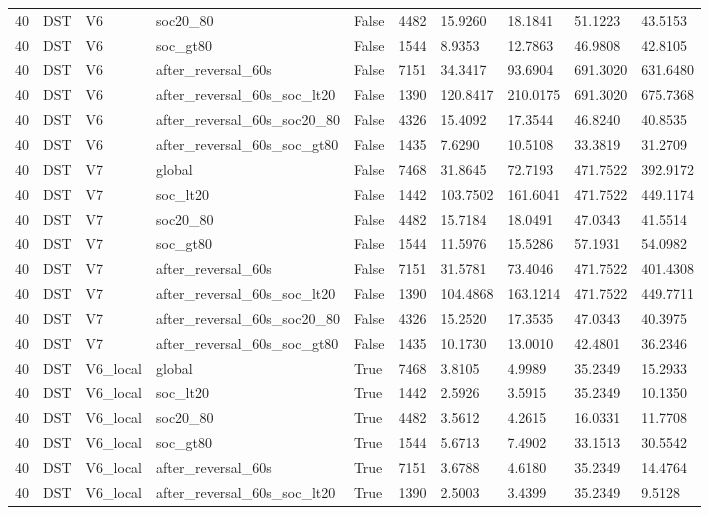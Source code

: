 \begin{tabular}{llllllllll}
40 & DST & V6 & soc20\_80 & False & 4482 & 15.9260 & 18.1841 & 51.1223 & 43.5153 \\
40 & DST & V6 & soc\_gt80 & False & 1544 & 8.9353 & 12.7863 & 46.9808 & 42.8105 \\
40 & DST & V6 & after\_reversal\_60s & False & 7151 & 34.3417 & 93.6904 & 691.3020 & 631.6480 \\
40 & DST & V6 & after\_reversal\_60s\_soc\_lt20 & False & 1390 & 120.8417 & 210.0175 & 691.3020 & 675.7368 \\
40 & DST & V6 & after\_reversal\_60s\_soc20\_80 & False & 4326 & 15.4092 & 17.3544 & 46.8240 & 40.8535 \\
40 & DST & V6 & after\_reversal\_60s\_soc\_gt80 & False & 1435 & 7.6290 & 10.5108 & 33.3819 & 31.2709 \\
40 & DST & V7 & global & False & 7468 & 31.8645 & 72.7193 & 471.7522 & 392.9172 \\
40 & DST & V7 & soc\_lt20 & False & 1442 & 103.7502 & 161.6041 & 471.7522 & 449.1174 \\
40 & DST & V7 & soc20\_80 & False & 4482 & 15.7184 & 18.0491 & 47.0343 & 41.5514 \\
40 & DST & V7 & soc\_gt80 & False & 1544 & 11.5976 & 15.5286 & 57.1931 & 54.0982 \\
40 & DST & V7 & after\_reversal\_60s & False & 7151 & 31.5781 & 73.4046 & 471.7522 & 401.4308 \\
40 & DST & V7 & after\_reversal\_60s\_soc\_lt20 & False & 1390 & 104.4868 & 163.1214 & 471.7522 & 449.7711 \\
40 & DST & V7 & after\_reversal\_60s\_soc20\_80 & False & 4326 & 15.2520 & 17.3535 & 47.0343 & 40.3975 \\
40 & DST & V7 & after\_reversal\_60s\_soc\_gt80 & False & 1435 & 10.1730 & 13.0010 & 42.4801 & 36.2346 \\
40 & DST & V6\_local & global & True & 7468 & 3.8105 & 4.9989 & 35.2349 & 15.2933 \\
40 & DST & V6\_local & soc\_lt20 & True & 1442 & 2.5926 & 3.5915 & 35.2349 & 10.1350 \\
40 & DST & V6\_local & soc20\_80 & True & 4482 & 3.5612 & 4.2615 & 16.0331 & 11.7708 \\
40 & DST & V6\_local & soc\_gt80 & True & 1544 & 5.6713 & 7.4902 & 33.1513 & 30.5542 \\
40 & DST & V6\_local & after\_reversal\_60s & True & 7151 & 3.6788 & 4.6180 & 35.2349 & 14.4764 \\
40 & DST & V6\_local & after\_reversal\_60s\_soc\_lt20 & True & 1390 & 2.5003 & 3.4399 & 35.2349 & 9.5128 \\

\end{tabular}

